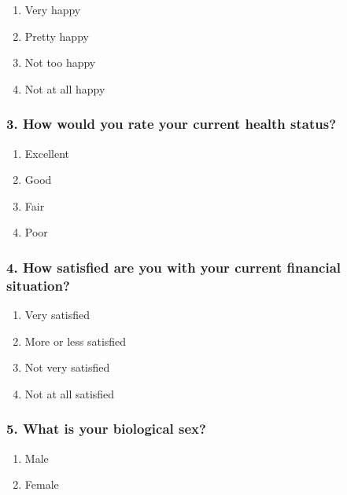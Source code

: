 \documentclass[
  letterpaper,
  DIV=11,
  numbers=noendperiod]{scrartcl}
\providecommand{\tightlist}{%
  \setlength{\itemsep}{0pt}\setlength{\parskip}{0pt}}\usepackage{longtable,booktabs,array}
\begin{document}
\begin{enumerate}
\def\labelenumi{\alph{enumi}.}
\tightlist
\item
  Very happy
\item
  Pretty happy
\item
  Not too happy
\item
  Not at all happy
\end{enumerate}

\hypertarget{how-would-you-rate-your-current-health-status}{%
\subsubsection{3. How would you rate your current health
status?}\label{how-would-you-rate-your-current-health-status}}

\begin{enumerate}
\def\labelenumi{\alph{enumi}.}
\tightlist
\item
  Excellent
\item
  Good
\item
  Fair
\item
  Poor
\end{enumerate}

\hypertarget{how-satisfied-are-you-with-your-current-financial-situation}{%
\subsubsection{4. How satisfied are you with your current financial
situation?}\label{how-satisfied-are-you-with-your-current-financial-situation}}

\begin{enumerate}
\def\labelenumi{\alph{enumi}.}
\tightlist
\item
  Very satisfied
\item
  More or less satisfied
\item
  Not very satisfied
\item
  Not at all satisfied
\end{enumerate}

\hypertarget{what-is-your-biological-sex}{%
\subsubsection{5. What is your biological
sex?}\label{what-is-your-biological-sex}}

\begin{enumerate}
\def\labelenumi{\alph{enumi}.}
\tightlist
\item
  Male
\item
  Female
\end{enumerate}
\end{document}
